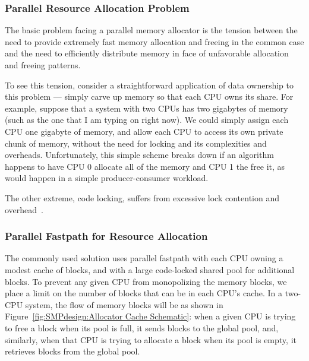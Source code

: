 \subsubsection{Parallel Resource Allocation Problem}

The basic problem facing a parallel memory allocator is the tension
between the need to provide extremely fast memory allocation and
freeing in the common case and the need to efficiently distribute
memory in face of unfavorable allocation and freeing patterns.

To see this tension, consider a straightforward application of
data ownership to this problem --- simply carve up memory so that
each CPU owns its share.
For example, suppose that a system with two CPUs has two gigabytes
of memory (such as the one that I am typing on right now).
We could simply assign each CPU one gigabyte of memory, and allow
each CPU to access its own private chunk of memory, without the
need for locking and its complexities and overheads.
Unfortunately, this simple scheme breaks down if an algorithm happens
to have CPU 0 allocate all of the memory and CPU 1 the free it, as
would happen in a simple producer-consumer workload.

The other extreme, code locking, suffers from excessive lock contention
and overhead~\cite{McKenney93}.

\subsubsection{Parallel Fastpath for Resource Allocation}

The commonly used solution uses parallel fastpath with each CPU
owning a modest cache of blocks, and with a large code-locked
shared pool for additional blocks.
To prevent any given CPU from monopolizing the memory blocks,
we place a limit on the number of blocks that can be in each CPU's
cache.
In a two-CPU system, the flow of memory blocks will be as shown
in Figure~\ref{fig:SMPdesign:Allocator Cache Schematic}:
when a given CPU is trying to free a block when its pool is full,
it sends blocks to the global pool, and, similarly, when that CPU
is trying to allocate a block when its pool is empty, it retrieves
blocks from the global pool.

